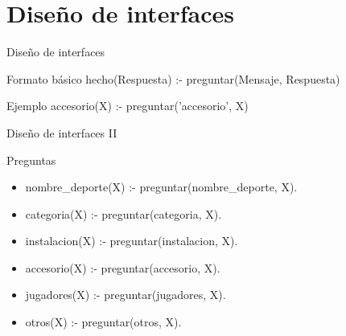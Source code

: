\section{Diseño de interfaces}
\begin{frame}
\end{frame}

\begin{frame}{Diseño de interfaces}
 \begin{block}{Formato básico}
hecho(Respuesta) :- 
	preguntar(Mensaje, Respuesta)
 \end{block}
 
  \begin{block}{Ejemplo}
accesorio(X) :- 
	preguntar('accesorio', X)
 \end{block}
\end{frame}

\begin{frame}{Diseño de interfaces II}
 \begin{block}{Preguntas}
 \begin{itemize}
  \item nombre\_deporte(X) :- preguntar(nombre\_deporte, X).
  \item categoria(X) :- preguntar(categoria, X).
  \item instalacion(X) :- preguntar(instalacion, X).
  \item accesorio(X) :- preguntar(accesorio, X).
  \item jugadores(X) :- preguntar(jugadores, X).
  \item otros(X) :- preguntar(otros, X).
 \end{itemize}
 \end{block}
\end{frame}
